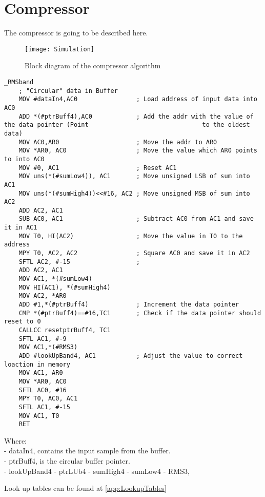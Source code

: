 \chapter{Compressor}

The compressor is going to be described here.


\begin{figure}[H]
    \centering
\texttt{[image: Simulation]}
    \caption{Block diagram of the compressor algorithm}
    \label{fig:RMSCompressorBlockImplmentation}
\end{figure}



\begin{lstlisting}[language={[x86masm]Assembler}, caption = {Compressor Algorithm},label={listingCompressorMain}]
_RMSband
	; "Circular" data in Buffer
	MOV #dataIn4,AC0				; Load address of input data into AC0
	ADD *(#ptrBuff4),AC0			; Add the addr with the value of the data pointer (Point 					 	       to the oldest data)
	MOV AC0,AR0						; Move the addr to AR0
	MOV *AR0, AC0					; Move the value which AR0 points to into AC0
	MOV #0, AC1						; Reset AC1
	MOV uns(*(#sumLow4)), AC1       ; Move unsigned LSB of sum into AC1
	MOV uns(*(#sumHigh4))<<#16, AC2 ; Move unsigned MSB of sum into AC2
	ADD AC2, AC1
	SUB AC0, AC1					; Subtract AC0 from AC1 and save it in AC1	 
	MOV T0, HI(AC2)					; Move the value in T0 to the address
	MPY T0, AC2, AC2				; Square AC0 and save it in AC2
	SFTL AC2, #-15					; 
	ADD AC2, AC1
	MOV AC1, *(#sumLow4)
	MOV HI(AC1), *(#sumHigh4)
	MOV AC2, *AR0
	ADD #1,*(#ptrBuff4)				; Increment the data pointer
	CMP *(#ptrBuff4)==#16,TC1		; Check if the data pointer should reset to 0
	CALLCC resetptrBuff4, TC1
	SFTL AC1, #-9
	MOV AC1,*(#RMS3)
	ADD #lookUpBand4, AC1			; Adjust the value to correct loaction in memory
	MOV AC1, AR0
	MOV *AR0, AC0
	SFTL AC0, #16
	MPY T0, AC0, AC1
	SFTL AC1, #-15
	MOV AC1, T0						
	RET
\end{lstlisting}

Where: \\
- dataIn4, contains the input sample from the buffer. \\
- ptrBuff4, is the circular buffer pointer. \\
- lookUpBand4
- ptrLUb4
- sumHigh4
- sumLow4
- RMS3,




Look up tables can be found at \ref{app:LookupTables}